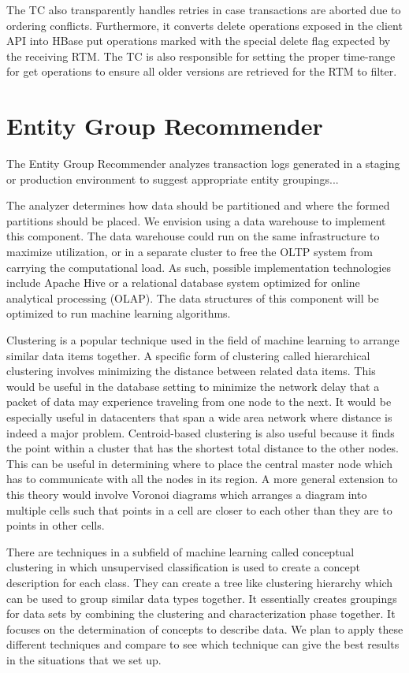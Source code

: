 \documentclass[10pt,final,journal]{IEEEtran}
\begin{document}
The TC also transparently handles retries in case transactions are aborted due to ordering conflicts. Furthermore, it converts delete operations exposed in the client API into HBase put operations marked with the special delete flag expected by the receiving RTM. The TC is also responsible for setting the proper time-range for get operations to ensure all older versions are retrieved for the RTM to filter.

\section{Entity Group Recommender}
The Entity Group Recommender analyzes transaction logs generated in a staging or production environment to suggest appropriate entity groupings...

The analyzer determines how data should be partitioned and where the formed partitions should be placed. We envision using a data warehouse to implement this component. The data warehouse could run on the same infrastructure to maximize utilization, or in a separate cluster to free the OLTP system from carrying the computational load. As such, possible implementation technologies include Apache Hive or a relational database system optimized for online analytical processing (OLAP). The data structures of this component will be optimized to run machine learning algorithms.

Clustering is a popular technique used in the field of machine learning to arrange similar data items together.  A specific form of clustering called hierarchical clustering involves minimizing the distance between related data items.  This would be useful in the database setting to minimize the network delay that a packet of data may experience traveling from one node to the next.  It would be especially useful in datacenters that span a wide area network where distance is indeed a major problem.  Centroid-based clustering is also useful because it finds the point within a cluster that has the shortest total distance to the other nodes.  This can be useful in determining where to place the central master node which has to communicate with all the nodes in its region.  A more general extension to this theory would involve Voronoi diagrams which arranges a diagram into multiple cells such that points in a cell are closer to each other than they are to points in other cells.

There are techniques in a subfield of machine learning called conceptual clustering in which unsupervised classification is used to create a concept description for each class. They can create a tree like clustering hierarchy which can be used to group similar data types together. It essentially creates groupings for data sets by combining the clustering and characterization phase together. It focuses on the determination of concepts to describe data. We plan to apply these different techniques and compare to see which technique can give the best results in the situations that we set up.
\end{document}
